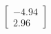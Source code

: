 \documentclass[preview]{standalone}
\begin{document}
\begin{align*}
\begin{bmatrix} -4.94 \\ 2.96 \end{bmatrix}
\end{align*}
\end{document}
